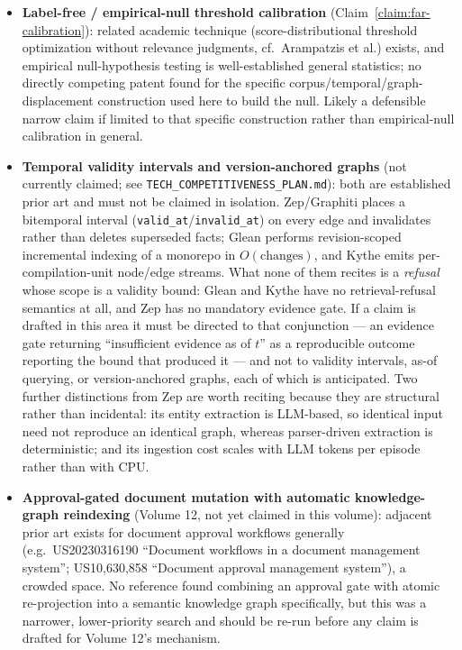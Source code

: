 \begin{itemize}
  \item \textbf{Label-free / empirical-null threshold calibration} (Claim~\ref{claim:far-calibration}): related academic technique (score-distributional threshold optimization without relevance judgments, cf.\ Arampatzis et al.) exists, and empirical null-hypothesis testing is well-established general statistics; no directly competing patent found for the specific corpus/temporal/graph-displacement construction used here to build the null. Likely a defensible narrow claim if limited to that specific construction rather than empirical-null calibration in general.
  \item \textbf{Temporal validity intervals and version-anchored graphs} (not currently claimed; see \texttt{TECH\_COMPETITIVENESS\_PLAN.md}): both are established prior art and must not be claimed in isolation. Zep/Graphiti \cite{rasmussen2025zep} places a bitemporal interval (\texttt{valid\_at}/\texttt{invalid\_at}) on every edge and invalidates rather than deletes superseded facts; Glean \cite{meta2024glean} performs revision-scoped incremental indexing of a monorepo in $O(\text{changes})$, and Kythe \cite{google_kythe} emits per-compilation-unit node/edge streams. What none of them recites is a \emph{refusal} whose scope is a validity bound: Glean and Kythe have no retrieval-refusal semantics at all, and Zep has no mandatory evidence gate. If a claim is drafted in this area it must be directed to that conjunction --- an evidence gate returning ``insufficient evidence as of $t$'' as a reproducible outcome reporting the bound that produced it --- and not to validity intervals, as-of querying, or version-anchored graphs, each of which is anticipated. Two further distinctions from Zep are worth reciting because they are structural rather than incidental: its entity extraction is LLM-based, so identical input need not reproduce an identical graph, whereas parser-driven extraction is deterministic; and its ingestion cost scales with LLM tokens per episode rather than with CPU.
  \item \textbf{Approval-gated document mutation with automatic knowledge-graph reindexing} (Volume 12, not yet claimed in this volume): adjacent prior art exists for document approval workflows generally (e.g.\ US20230316190 ``Document workflows in a document management system''; US10,630,858 ``Document approval management system''), a crowded space. No reference found combining an approval gate with atomic re-projection into a semantic knowledge graph specifically, but this was a narrower, lower-priority search and should be re-run before any claim is drafted for Volume 12's mechanism.
\end{itemize}

